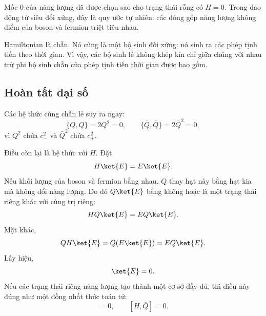 Mốc 0 của năng lượng đã được chọn sao cho trạng thái rỗng có \(H=0\). Trong dao động tử siêu đối xứng, đây là quy ước tự nhiên: các đóng góp năng lượng không điểm của boson và fermion triệt tiêu nhau. 

Hamiltonian là chẵn. Nó cũng là một bộ sinh đối xứng: nó sinh ra các phép tịnh tiến theo thời gian. Vì vậy, các bộ sinh lẻ không khép kín chỉ giữa chúng với nhau trừ phi bộ sinh chẵn của phép tịnh tiến thời gian được bao gồm.

\begin{classroomqa}
\end{classroomqa}

\subsection{Hoàn tất đại số}

Các hệ thức cùng chẵn lẻ suy ra ngay:
\begin{equation}
\{Q,Q\}=2Q^2=0,
\qquad
\{\bar Q,\bar Q\}=2\bar Q^2=0,
\end{equation}
vì \(Q^2\) chứa \(c_-^2\) và \(\bar Q^2\) chứa \(c_+^2\).

Điều còn lại là hệ thức với \(H\). Đặt
\begin{equation}
H\ket{E}=E\ket{E}.
\end{equation}
Nếu khối lượng của boson và fermion bằng nhau, \(Q\) thay hạt này bằng hạt kia mà không đổi năng lượng. Do đó \(Q\ket{E}\) bằng không hoặc là một trạng thái riêng khác với cùng trị riêng:
\begin{equation}
H Q\ket{E}=E Q\ket{E}.
\end{equation}
Mặt khác,
\begin{equation}
QH\ket{E}=Q(E\ket{E})=E Q\ket{E}.
\end{equation}
Lấy hiệu,
\begin{equation}
[H,Q]\ket{E}=0.
\end{equation}
Nếu các trạng thái riêng năng lượng tạo thành một cơ sở đầy đủ, thì điều này đúng như một đồng nhất thức toán tử:
\begin{equation}
[H,Q]=0,
\qquad
[H,\bar Q]=0.
\end{equation}


